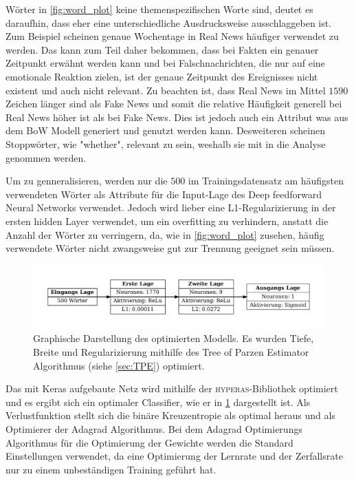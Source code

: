 Wörter in \ref{fig:word_plot} keine themenspezifischen Worte sind, deutet es daraufhin, dass eher eine unterschiedliche 
Ausdrucksweise ausschlaggeben ist. 
Zum Beispiel scheinen genaue Wochentage in Real News häufiger verwendet zu werden. 
Das kann zum Teil daher bekommen, dass bei Fakten ein genauer Zeitpunkt erwähnt werden kann und bei Falschnachrichten, die 
nur auf eine emotionale Reaktion zielen, ist der genaue Zeitpunkt des Ereignisses nicht existent und auch nicht relevant.
Zu beachten ist, dass Real News im Mittel $\num{1590}$ Zeichen länger sind als Fake News und somit die relative Häufigkeit 
generell bei Real News höher ist als bei Fake News. 
Dies ist jedoch auch ein Attribut was aus dem BoW Modell generiert und genutzt werden kann.
Desweiteren scheinen Stoppwörter, wie "whether", relevant zu sein, weshalb sie mit in die Analyse genommen werden.

Um zu genneralisieren, werden nur die $500$ im Trainingsdatensatz am häufigsten verwendeten Wörter als Attribute 
für die Input-Lage des Deep feedforward Neural Networks verwendet. 
Jedoch wird lieber eine L1-Regularizierung in der ersten hidden Layer verwendet, um ein overfitting zu verhindern, 
anstatt die Anzahl der Wörter zu verringern, da, wie in \ref{fig:word_plot} zusehen, häufig verwendete Wörter nicht 
zwangsweise gut zur Trennung geeignet sein müssen.

\begin{figure}
    \centering
    \includegraphics[width=\textwidth]{pictures/modell_scheme.pdf}
    \caption{Graphische Darstellung des optimierten Modells. Es wurden Tiefe, Breite und Regularizierung mithilfe 
            des Tree of Parzen Estimator Algorithmus (siehe \ref{sec:TPE}) optimiert.}
    \label{fig:NN_structure}
\end{figure}

Das mit Keras\cite{keras} aufgebaute Netz wird mithilfe der \textsc{hyperas}-Bibliothek\cite{hyperas} optimiert und 
es ergibt sich ein optimaler Classifier, wie er in \ref{fig:NN_structure} dargestellt ist.
Als Verlustfunktion stellt sich die binäre Kreuzentropie als optimal heraus und als Optimierer der Adagrad Algorithmus.
Bei dem Adagrad Optimierungs Algorithmus für die Optimierung der Gewichte werden die Standard Einstellungen verwendet, 
da eine Optimierung der Lernrate und der Zerfallsrate nur zu einem unbeständigen Training geführt hat.


